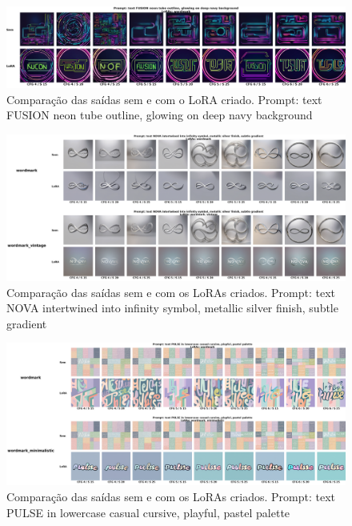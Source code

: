 \documentclass[12pt, %
openright, 
oneside, %
a4paper,    %
brazil]{facom-ufu-abntex2}
\begin{document}
\begin{figure}[H]
    \centering
    \includegraphics[width=1.0\linewidth]{figuras/resultados/good/wordmark/p23_batch1.png}
    \caption[4º Comparação das saídas sem e com o LoRA criado.]{Comparação das saídas sem e com o LoRA criado. Prompt: text FUSION neon tube outline, glowing on deep navy background}
    \label{fig:wordmarkP23Batch1}
\end{figure}

\begin{figure}[H]
    \centering
    \includegraphics[width=1.0\linewidth]{figuras/resultados/good/wordmark/cmp_p3_batch0.png}
    \caption[5º Comparação das saídas sem e com os LoRAs criados.]{Comparação das saídas sem e com os LoRAs criados. Prompt: text NOVA intertwined into infinity symbol, metallic silver finish, subtle gradient}
    \label{fig:wordmarkCmpP3Batch0}
\end{figure}

\begin{figure}[H]
    \centering
    \includegraphics[width=1.0\linewidth]{figuras/resultados/good/wordmark/cmp_p4_batch0.png}
    \caption[6º Comparação das saídas sem e com os LoRAs criados.]{Comparação das saídas sem e com os LoRAs criados. Prompt: text PULSE in lowercase casual cursive, playful, pastel palette}
    \label{fig:wordmarkCmpP4Batch0}
\end{figure}
\end{document}
